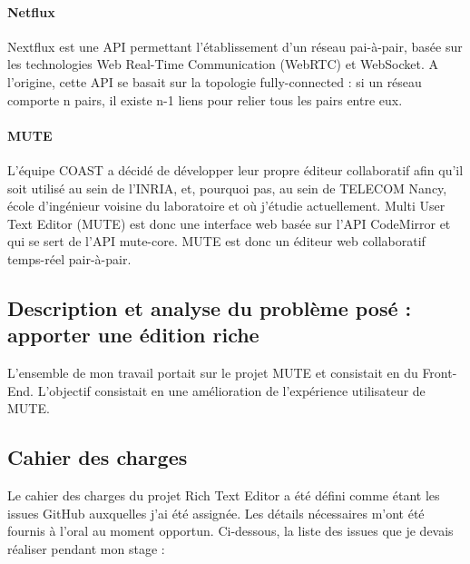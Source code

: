\documentclass[12pt]{article}
\begin{document}
\paragraph{Netflux}
Nextflux \cite{netflux} est une API permettant l'établissement d'un réseau pai-à-pair, basée sur les technologies Web Real-Time Communication (WebRTC) et WebSocket. A l'origine, cette API se basait sur la topologie fully-connected \cite{fully} : si un réseau comporte n pairs, il existe n-1 liens pour relier tous les pairs entre eux.

\paragraph{MUTE}
L'équipe COAST a décidé de développer leur propre éditeur collaboratif afin qu'il soit utilisé au sein de l'INRIA, et, pourquoi pas, au sein de TELECOM Nancy, école d'ingénieur voisine du laboratoire et où j'étudie actuellement. Multi User Text Editor (MUTE) est donc une interface web basée sur l'API CodeMirror et qui se sert de l'API mute-core. MUTE est donc un éditeur web collaboratif temps-réel pair-à-pair.

\subsection{Description et analyse du problème posé : apporter une édition riche}
L'ensemble de mon travail portait sur le projet MUTE et consistait en du Front-End. L'objectif consistait en une amélioration de l'expérience utilisateur de MUTE.


\subsection{Cahier des charges}
Le cahier des charges du projet Rich Text Editor a été défini comme étant les issues GitHub auxquelles j'ai été assignée. Les détails nécessaires m'ont été fournis à l'oral au moment opportun. Ci-dessous, la liste des issues que je devais réaliser pendant mon stage :\\
\end{document}
